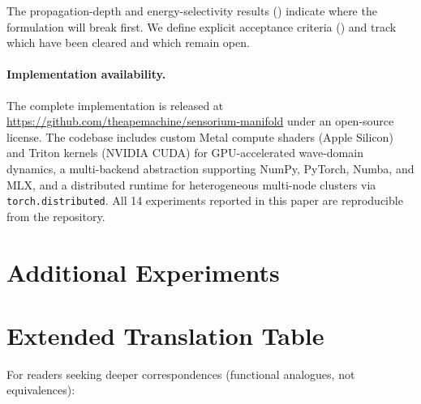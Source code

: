 \documentclass[11pt,a4paper]{article}
\begin{document}
The propagation-depth and energy-selectivity results () indicate where the formulation will break first. We define explicit acceptance criteria () and track which have been cleared and which remain open.

\paragraph{Implementation availability.}
The complete implementation is released at \url{https://github.com/theapemachine/sensorium-manifold} under an open-source license. The codebase includes custom Metal compute shaders (Apple Silicon) and Triton kernels (NVIDIA CUDA) for GPU-accelerated wave-domain dynamics, a multi-backend abstraction supporting NumPy, PyTorch, Numba, and MLX, and a distributed runtime for heterogeneous multi-node clusters via \texttt{torch.distributed}. All 14 experiments reported in this paper are reproducible from the repository.








\appendix

\section{Additional Experiments}
\label{sec:appendix_experiments}

\section{Extended Translation Table}
\label{app:translation}

For readers seeking deeper correspondences (functional analogues, not equivalences):
\end{document}
